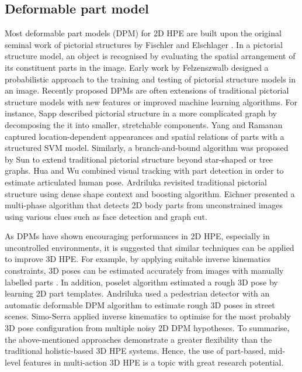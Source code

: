 \subsection{Deformable part model}  
Most deformable part models (DPM) for 2D HPE are built upon the original seminal work of pictorial structures by Fischler and Elschlager \cite{Fischler1981}. In a pictorial structure model, an object is recognised by evaluating the spatial arrangement of its constituent parts in the image. Early work by Felzenszwalb \etal \cite{Felzenszwalb2000, Felzenszwalb2005} designed a probabilistic approach to the training and testing of pictorial structure models in an image. Recently proposed DPMs are often extensions of traditional pictorial structure models with new features or improved machine learning algorithms. For instance, Sapp \etal \cite{Sapp2011} described pictorial structure in a more complicated graph by decomposing the it into smaller, stretchable components. Yang and Ramanan \cite{Yang2011} captured location-dependent appearances and spatial relations of parts with a structured SVM model. Similarly, a branch-and-bound algorithm was proposed by Sun \etal \cite{Sun2012a} to extend traditional pictorial structure beyond star-shaped or tree graphs. Hua and Wu \cite{Hua2007} combined visual tracking with part detection in order to estimate articulated human pose. Ardriluka \etal \cite{Andriluka2009} revisited traditional pictorial structure using dense shape context and boosting algorithm. Eichner \etal \cite{Eichner2012} presented a multi-phase algorithm that detects 2D body parts from unconstrained images using various clues such as face detection and graph cut. 

As DPMs have shown encouraging performances in 2D HPE, especially in uncontrolled environments, it is suggested that similar techniques can be applied to improve 3D HPE. For example, by applying suitable inverse kinematics constraints, 3D poses can be estimated accurately from images with manually labelled parts \cite{Wei2009, Ramakrishna2012}. In addition, poselet algorithm \cite{Bourdev2009} estimated a rough 3D pose by learning 2D part templates. Andriluka \etal \cite{Andriluka2010} used a pedestrian detector with an automatic deformable DPM algorithm to estimate rough 3D poses in street scenes. Simo-Serra \etal \cite{Simo-Serra2012} applied inverse kinematics to optimise for the most probably 3D pose configuration from multiple noisy 2D DPM hypotheses. To summarise, the above-mentioned approaches demonstrate a greater flexibility than the traditional holistic-based 3D HPE systems. Hence, the use of part-based, mid-level features in multi-action 3D HPE is a topic with great research potential. 

